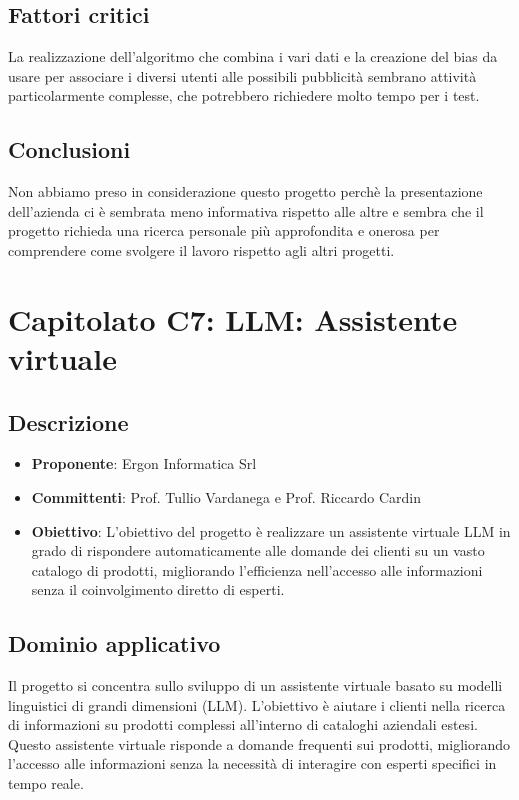 \documentclass[italian, 12pt]{article}
\begin{document}
\subsection{Fattori critici}
La realizzazione dell'algoritmo che combina i vari dati e la creazione del bias da usare per associare i diversi utenti alle possibili pubblicità sembrano attività particolarmente complesse, che potrebbero richiedere molto tempo per i test.

\subsection{Conclusioni}
Non abbiamo preso in considerazione questo progetto perchè la presentazione dell’azienda ci è sembrata meno informativa rispetto alle altre e sembra che il progetto richieda una ricerca personale più approfondita e onerosa per comprendere come svolgere il lavoro rispetto agli altri progetti.

\section{Capitolato C7: LLM: Assistente virtuale}
\subsection{Descrizione}
\begin{itemize}
\item\textbf{Proponente}: Ergon Informatica Srl
\item\textbf{Committenti}: Prof. Tullio Vardanega e Prof. Riccardo Cardin
\item\textbf{Obiettivo}: L'obiettivo del progetto è realizzare un assistente virtuale LLM in grado di rispondere automaticamente alle domande dei clienti su un vasto catalogo di prodotti, migliorando l'efficienza nell'accesso alle informazioni senza il coinvolgimento diretto di esperti.
\end{itemize}

\subsection{Dominio applicativo}
Il progetto si concentra sullo sviluppo di un assistente virtuale basato su modelli linguistici di grandi dimensioni (LLM). L'obiettivo è aiutare i clienti nella ricerca di informazioni su prodotti complessi all'interno di cataloghi aziendali estesi. Questo assistente virtuale risponde a domande frequenti sui prodotti, migliorando l'accesso alle informazioni senza la necessità di interagire con esperti specifici in tempo reale.
\end{document}
